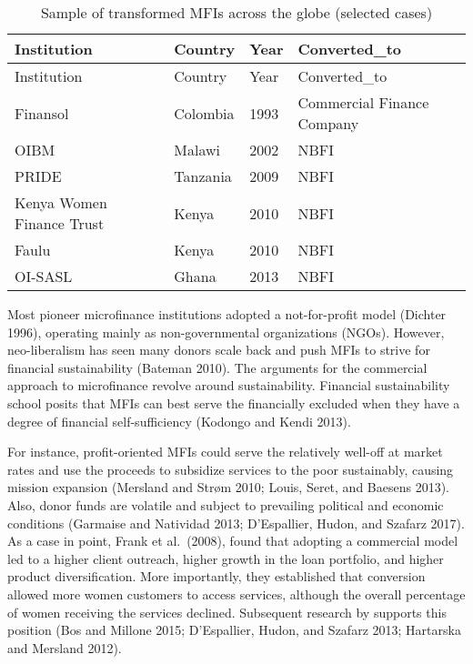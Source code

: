 \documentclass[
]{article}
\begin{document}
\begin{longtable}[]{@{}llll@{}}
\caption{Sample of transformed MFIs across the globe (selected
cases)}\tabularnewline
\toprule
Institution & Country & Year & Converted\_to\tabularnewline
\midrule
\endfirsthead
\toprule
Institution & Country & Year & Converted\_to\tabularnewline
\midrule
\endhead
Finansol & Colombia & 1993 & Commercial Finance Company\tabularnewline
OIBM & Malawi & 2002 & NBFI\tabularnewline
PRIDE & Tanzania & 2009 & NBFI\tabularnewline
Kenya Women Finance Trust & Kenya & 2010 & NBFI\tabularnewline
Faulu & Kenya & 2010 & NBFI\tabularnewline
OI-SASL & Ghana & 2013 & NBFI\tabularnewline
\bottomrule
\end{longtable}

Most pioneer microfinance institutions adopted a not-for-profit model
(Dichter 1996), operating mainly as non-governmental organizations
(NGOs). However, neo-liberalism has seen many donors scale back and push
MFIs to strive for financial sustainability (Bateman 2010). The
arguments for the commercial approach to microfinance revolve around
sustainability. Financial sustainability school posits that MFIs can
best serve the financially excluded when they have a degree of financial
self-sufficiency (Kodongo and Kendi 2013).

For instance, profit-oriented MFIs could serve the relatively well-off
at market rates and use the proceeds to subsidize services to the poor
sustainably, causing mission expansion (Mersland and Strøm 2010; Louis,
Seret, and Baesens 2013). Also, donor funds are volatile and subject to
prevailing political and economic conditions (Garmaise and Natividad
2013; D'Espallier, Hudon, and Szafarz 2017). As a case in point, Frank
et al.~(2008), found that adopting a commercial model led to a higher
client outreach, higher growth in the loan portfolio, and higher product
diversification. More importantly, they established that conversion
allowed more women customers to access services, although the overall
percentage of women receiving the services declined. Subsequent research
by supports this position (Bos and Millone 2015; D'Espallier, Hudon, and
Szafarz 2013; Hartarska and Mersland 2012).
\end{document}
